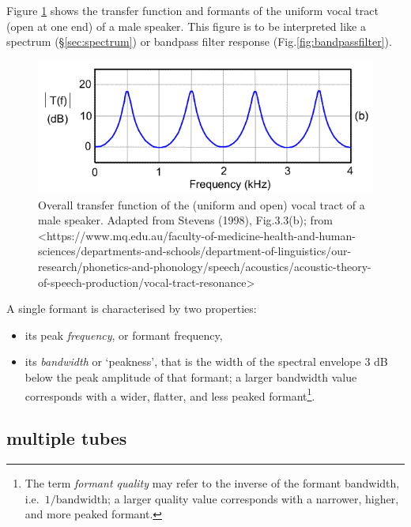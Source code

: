 \documentclass[
]{book}
\begin{document}
Figure \ref{fig:uniform-vt-transfer} shows the transfer function and formants of the uniform vocal tract (open at one end) of a male speaker. This figure is to be interpreted like a spectrum (§\ref{sec:spectrum}) or bandpass filter response (Fig.\ref{fig:bandpassfilter}).

\begin{figure}

{\centering \includegraphics{figures/formants_stevens01_b} 

}

\caption{Overall transfer function of the (uniform and open) vocal tract of a male speaker. Adapted from Stevens (1998), Fig.3.3(b); from <https://www.mq.edu.au/faculty-of-medicine-health-and-human-sciences/departments-and-schools/department-of-linguistics/our-research/phonetics-and-phonology/speech/acoustics/acoustic-theory-of-speech-production/vocal-tract-resonance>}\label{fig:uniform-vt-transfer}
\end{figure}

A single formant is characterised by two properties:

\begin{itemize}
\item
  its peak \emph{frequency}, or formant frequency,
\item
  its \emph{bandwidth} or `peakness', that is the width of the spectral envelope \(3\) dB below the peak amplitude of that formant; a larger bandwidth value corresponds with a wider, flatter, and less peaked formant\footnote{The term \emph{formant quality} may refer to the inverse of the formant bandwidth, i.e.~\(1/\textrm{bandwidth}\); a larger quality value corresponds with a narrower, higher, and more peaked formant.}.
\end{itemize}

\subsection{multiple tubes}\label{sec:moretubes}
\end{document}
